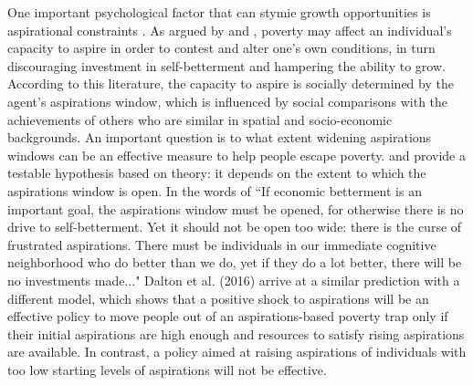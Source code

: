 \documentclass[11.5pt]{article}
\begin{document}
One important psychological factor that can stymie growth opportunities is aspirational constraints \citep{Ray2006, Genicot2017, Dalton2016, Bogliacino2014, Lybbert2018}. As argued by \citet{Appadurai2004} and \citet{Ray2006}, poverty may affect an individual's capacity to aspire in order to contest and alter one's own conditions, in turn discouraging investment in self-betterment and hampering the ability to grow. According to this literature, the capacity to aspire is socially determined by the agent's aspirations window, which is influenced by social comparisons with the achievements of others who are similar in spatial and socio-economic backgrounds. An important question is to what extent widening aspirations windows can be an effective measure to help people escape poverty. \citet{Ray2006} and \citet{Genicot2017} provide a testable hypothesis based on theory: it depends on the extent to which the aspirations window is open. In the words of \citet[][p.4]{Ray2003} ``If economic betterment is an important goal, the aspirations window must be opened, for otherwise there is no drive to self-betterment. Yet it should not be open too wide: there is the curse of frustrated aspirations. There must be individuals in our immediate cognitive neighborhood who do better than we do, yet if they do a lot better, there will be no investments made..."  Dalton et al. (2016) arrive at a similar prediction with a different model, which shows that a positive shock to aspirations will be an effective policy to move people out of an aspirations-based poverty trap only if their initial aspirations are high enough and resources to satisfy rising aspirations are available. In contrast, a policy aimed at raising aspirations of individuals with too low starting levels of aspirations will not be effective.

\end{document}
